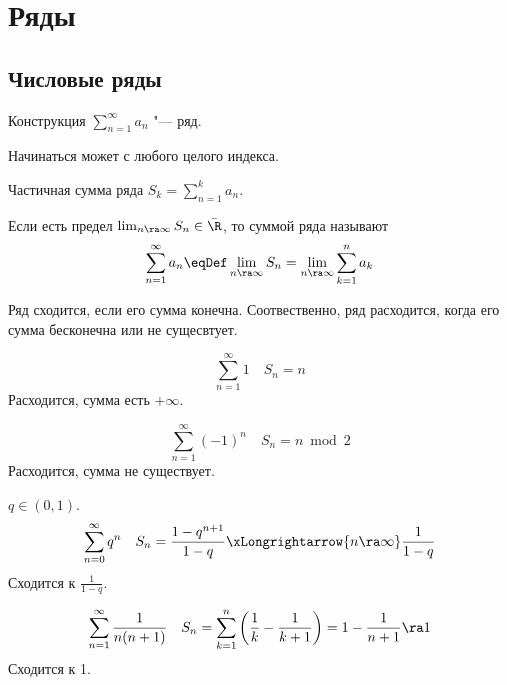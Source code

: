 \chapter{Ряды}

\section{Числовые ряды}

\begin{Def}
	Конструкция $\sum_{n=1}^\infty a_n$ "--- ряд.
\end{Def}
\begin{Rem}
	Начинаться может с любого целого индекса.
\end{Rem}

\begin{Def}
	Частичная сумма ряда $S_k = \sum_{n=1}^k a_n$.
\end{Def}

\begin{Def}
	Если есть предел $\lim_{n \ra \infty} S_n \in \bar \R$, то суммой ряда называют
	\[ \sum_{n=1}^\infty a_n \eqDef \lim_{n \ra \infty} S_n = \lim_{n \ra \infty} \sum_{k=1}^n a_k \]
\end{Def}

\begin{Def}
	Ряд сходится, если его сумма конечна.
	Соотвественно, ряд расходится, когда его сумма бесконечна или не сущесвтует.
\end{Def}

\begin{exmp}
	\[
		\sum_{n=1}^\infty 1 \quad S_n = n
	\]
	Расходится, сумма есть $+\infty$.
\end{exmp}

\begin{exmp}
	\[
		\sum_{n=1}^\infty (-1)^n \quad S_n = n \bmod 2
	\]
	Расходится, сумма не существует.
\end{exmp}

\begin{exmp}
	$q \in (0, 1)$.
	\[
		\sum_{n=0}^\infty q^n \quad S_n = \frac{1-q^{n+1}}{1-q} \xLongrightarrow{n \ra \infty} \frac1{1-q}
	\]
	Сходится к $\frac1{1-q}$.
\end{exmp}

\begin{exmp}
	\[
		\sum_{n=1}^\infty \frac1{n(n+1)} \quad S_n = \sum_{k=1}^n \left(\frac1k - \frac1{k+1}\right) = 1 - \frac1{n+1} \ra 1
	\]
	Сходится к 1.
\end{exmp}


